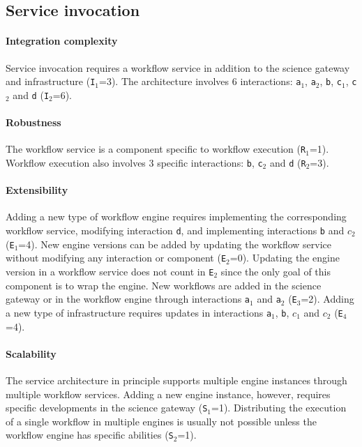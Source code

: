 \documentclass[preprint,3p,twocolumn]{elsarticle}
\begin{document}
\subsection{Service invocation}

\paragraph{Integration complexity} Service invocation requires a workflow service
in addition to the science gateway and infrastructure
(\texttt{I$_1$}=3). The architecture involves 6 interactions:
\texttt{a$_1$}, \texttt{a$_2$}, \texttt{b}, \texttt{c$_1$},
\texttt{c$_2$} and \texttt{d} (\texttt{I$_2$}=6).

\paragraph{Robustness} The workflow service is a component specific to
workflow execution (\texttt{R$_1$}=1). Workflow execution also
involves 3 specific interactions: \texttt{b},
\texttt{c$_2$} and \texttt{d} (\texttt{R$_2$}=3).

\paragraph{Extensibility} Adding a new type of workflow engine
requires implementing the corresponding workflow service,  modifying
interaction \texttt{d}, and  implementing interactions \texttt{b} and
\texttt{$c_2$} (\texttt{E$_1$}=4). New engine versions can be added by
updating the workflow service without modifying any interaction or
component (\texttt{E$_2$}=0). Updating the engine version in a
workflow service does not count in \texttt{E$_2$} since the only goal of this component
is to wrap the engine.  New workflows are added in the science gateway
or in the workflow engine through interactions \texttt{a$_1$} and
\texttt{a$_2$} (\texttt{E$_3$}=2). Adding a new type of infrastructure
requires updates in interactions \texttt{a$_1$}, \texttt{b},
\texttt{$c_1$} and \texttt{$c_2$} (\texttt{E$_4$}=4).

\paragraph{Scalability} The service architecture in principle supports
multiple engine instances through multiple workflow services. Adding a
new engine instance, however, requires specific developments in the science gateway
(\texttt{S$_1$}=1). Distributing the execution of a single workflow in multiple
engines is usually not possible unless the workflow engine has
specific abilities (\texttt{S$_2$}=1).
\end{document}
